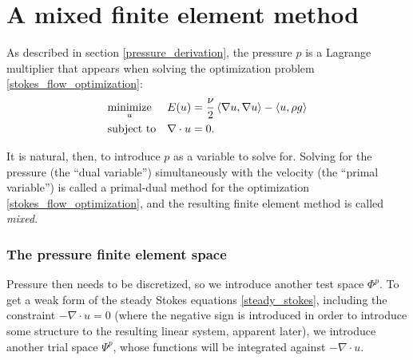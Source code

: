 
\section{A mixed finite element method}
As described in section \ref{pressure_derivation}, the pressure $p$ is a Lagrange multiplier that appears
when solving the optimization problem \eqref{stokes_flow_optimization}:
\begin{equation*}
\begin{aligned}
& \underset{u}{\text{minimize}}
& & E(u) =  \frac{\nu}{2} \left<\nabla u, \nabla u\right> - \left<u, \rho g\right>\\
& \text{subject to}
& & \nabla\cdot u = 0.
\end{aligned}
\end{equation*}

\newcommand{\trialconstraint}{{\Psi_{\text{constraint}}}}
\newcommand{\testpressure}{{\Phi_{\text{pressure}}}}
It is natural, then, to introduce $p$ as a variable to solve for. Solving for the pressure (the ``dual variable'') simultaneously with the velocity
(the ``primal variable'')
is called a primal-dual method for the optimization \eqref{stokes_flow_optimization}, and the resulting finite element method is called \textit{mixed}.

\subsubsection{The pressure finite element space}
Pressure then needs to be discretized, so we introduce another test space $\Phi^p$.
To get a weak form of the steady Stokes equations \eqref{steady_stokes}, including the constraint $-\nabla\cdot u = 0$
(where the negative sign is introduced in order to introduce some structure to the resulting linear system, apparent later), we introduce
another trial space $\Psi^p$, whose functions will be integrated against $-\nabla\cdot u$.


